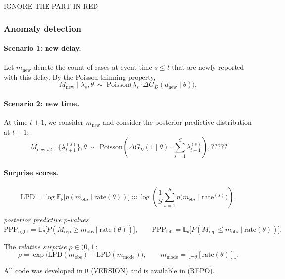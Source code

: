\documentclass[12pt]{article}
\begin{document}
{\color{red} IGNORE THE PART IN RED
\subsubsection{Anomaly detection}

\paragraph{Scenario 1: new delay.}
Let $m_{\text{new}}$
denote the count of cases at event time $s \leq t$ that are newly reported with
this delay. By the Poisson thinning property, 
\begin{equation}\label{eq:s1_dist}
  M_{\mathrm{new}} \mid \lambda_s, \theta
  \;\sim\; \mathrm{Poisson}\!\bigl(\lambda_s \cdot \Delta G_D(d_{\mathrm{new}} \mid \theta)\bigr),
\end{equation}
%


\paragraph{Scenario 2: new time.}
At time $t+1$, we consider $m_{\mathrm{new}}$ and consider the posterior predictive distribution at $t+ 1$: 
%
\begin{equation}\label{eq:s2_dist}
  M_{\mathrm{new},s2} \mid \{\lambda_{t+1}^{(s)}\}, \theta
  \;\sim\; \mathrm{Poisson}\!\!\left(\Delta G_D(1 \mid \theta)
  \cdot \sum_{s=1}^{S} \lambda_{t+1}^{(s)}\right),?????
\end{equation}
%


\paragraph{Surprise scores.}

%
\begin{equation}
  \mathrm{LPD} = \log \mathbb{E}_\theta\bigl[p(m_{\mathrm{obs}} \mid \mathrm{rate}(\theta))\bigr]
  \approx \log\!\left(\frac{1}{S}\sum_{s=1}^{S} p\bigl(m_{\mathrm{obs}} \mid \mathrm{rate}^{(s)}\bigr)\right),
\end{equation}
%

\emph{posterior predictive $p$-values} 
%
\begin{equation}
  \mathrm{PPP}_{\mathrm{right}} = \mathbb{E}_\theta\bigl[P(M_{\mathrm{rep}} \geq m_{\mathrm{obs}} \mid \mathrm{rate}(\theta))\bigr],
  \qquad
  \mathrm{PPP}_{\mathrm{left}}  = \mathbb{E}_\theta\bigl[P(M_{\mathrm{rep}} \leq m_{\mathrm{obs}} \mid \mathrm{rate}(\theta))\bigr].
\end{equation}

The \emph{relative surprise} $\rho \in (0, 1]$:
%
\begin{equation}
  \rho = \exp\!\bigl(\mathrm{LPD}(m_{\mathrm{obs}}) - \mathrm{LPD}(m_{\mathrm{mode}})\bigr),
  \qquad
  m_{\mathrm{mode}} = \lfloor \mathbb{E}_\theta[\mathrm{rate}(\theta)] \rfloor.
\end{equation}
%

All code was developed in \texttt{R} {\color{red} (VERSION)} and is available in {\color{red} (REPO)}. 


}
\end{document}
